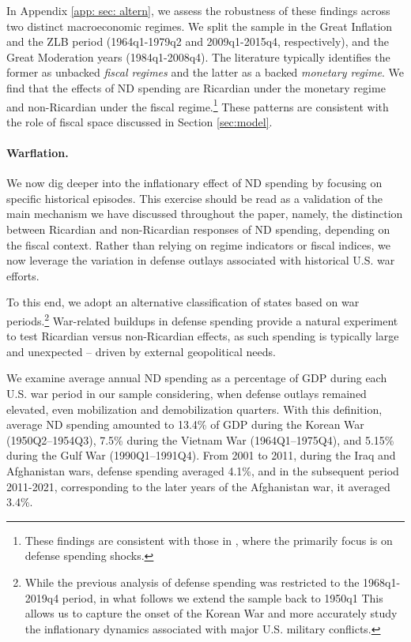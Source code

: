 \documentclass[12pt]{article}%
\theoremstyle{remark}
\begin{document}
In Appendix \ref{app: sec: altern}, we assess the robustness of these findings across two distinct macroeconomic regimes. We split the sample in the Great Inflation and the ZLB period (1964q1-1979q2 and 2009q1-2015q4, respectively), and the Great Moderation years (1984q1-2008q4). The literature typically identifies the former as unbacked \textit{fiscal regimes} and the latter as a backed \textit{monetary regime}. We find that the effects of ND spending are Ricardian under the monetary regime and non-Ricardian under the fiscal regime.\footnote{These findings are consistent with those in \cite{ASCARI20231}, where the primarily focus is on defense spending shocks.} 
These patterns are consistent with the role of fiscal space discussed in Section \ref{sec:model}.


 
\paragraph{Warflation.} We now dig deeper into the inflationary effect of ND spending by focusing on specific historical episodes. This exercise should be read as a validation of the main mechanism we have discussed throughout the paper, namely, the distinction between Ricardian and non-Ricardian responses of ND spending, depending on the fiscal context. Rather than relying on regime indicators or fiscal indices, we now leverage the variation in defense outlays associated with historical U.S. war efforts. 

To this end, we adopt an alternative classification of states based on war periods.\footnote{While the previous analysis of defense spending was restricted to the 1968q1-2019q4 period, in what follows we extend the sample back to 1950q1 %
This allows us to capture the onset of the Korean War and more accurately study the inflationary dynamics associated with major U.S. military conflicts.} War-related buildups in defense spending provide a natural experiment to test Ricardian versus non-Ricardian effects, as such spending is typically large and unexpected -- driven by external geopolitical needs.

  

We examine average annual ND spending as a percentage of GDP during each U.S. war period in our sample considering, when defense outlays remained elevated, even mobilization and demobilization quarters.
With this definition, average ND spending amounted to 13.4\% of GDP during the Korean War (1950Q2–1954Q3), 7.5\% during the Vietnam War (1964Q1–1975Q4), and 5.15\% during the Gulf War (1990Q1–1991Q4). From 2001 to 2011, during the Iraq and Afghanistan wars, defense spending averaged 4.1\%, and in the subsequent period 2011-2021, corresponding to the later years of the Afghanistan war, it averaged 3.4\%.
\end{document}
